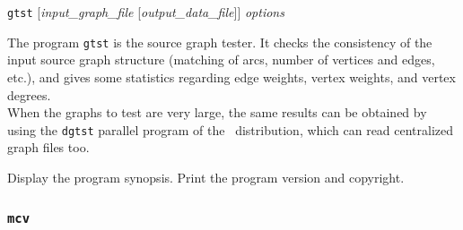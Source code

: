 \begin{itemize}
\progsyn
\texttt{gtst} [{\it input\_graph\_file} [{\it output\_data\_file}]] {\it options}

\progdes
The program \texttt{gtst} is the source graph tester. It checks the
consistency of the input source graph structure (matching of arcs,
number of vertices and edges, etc\@.), and gives some statistics
regarding edge weights, vertex weights, and vertex degrees.
\\

When the graphs to test are very large, the same results can
be obtained by using the \texttt{dgtst} parallel program of the
\ptscotch\ distribution, which can read centralized graph
files too.

\progopt
\begin{itemize}
\iteme[\texttt{-h}]
Display the program synopsis.
\iteme[\texttt{-V}]
Print the program version and copyright.
\end{itemize}
\end{itemize}

\subsubsection{\texttt{mcv}}
\label{sec-prog-mcv}

